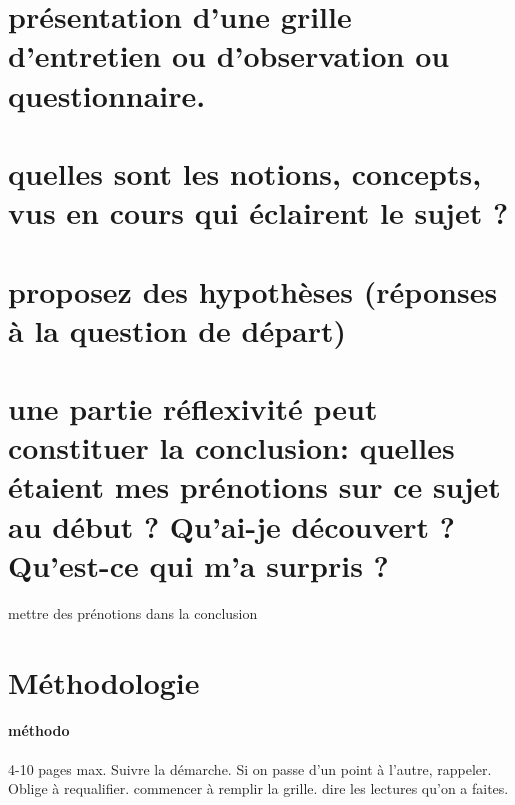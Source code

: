 
\section{présentation d’une grille d’entretien ou d’observation ou questionnaire.}



\section{quelles sont les notions, concepts, vus en cours qui éclairent le sujet ?}



\section{proposez des hypothèses (réponses à la question de départ)}



\section{une partie réflexivité peut constituer la conclusion: quelles étaient mes prénotions sur ce sujet au début ? Qu’ai-je découvert ? Qu’est-ce qui m’a surpris ?}
 mettre des prénotions dans la conclusion



\section{Méthodologie}
\paragraph{méthodo}
4-10 pages max.
Suivre la démarche. Si on passe d'un point à l'autre, rappeler. 
Oblige à requalifier.
commencer à remplir la grille.
dire les lectures qu'on a faites.
 
